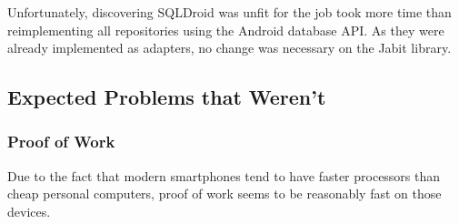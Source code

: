 \documentclass{bfh}
\begin{document}
  Unfortunately, discovering SQLDroid was unfit for the job took more time than reimplementing all repositories using the Android database API. As they were already implemented as adapters, no change was necessary on the Jabit library.

  \subsection{Expected Problems that Weren't}
  \subsubsection{Proof of Work}
  Due to the fact that modern smartphones tend to have faster processors than cheap personal computers, proof of work seems to be reasonably fast on those devices.
\end{document}
